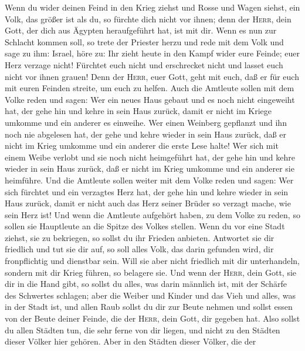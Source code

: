  Wenn du wider deinen Feind in den Krieg ziehst und Rosse
und Wagen siehst, ein Volk, das größer ist als du, so fürchte dich nicht
vor ihnen; denn der \textsc{Herr}, dein Gott, der dich aus Ägypten
heraufgeführt hat, ist mit dir.  Wenn es nun zur Schlacht
kommen soll, so trete der Priester herzu und rede mit dem Volk und sage
zu ihm: Israel, höre zu:  Ihr zieht heute in den Kampf
wider eure Feinde; euer Herz verzage nicht! Fürchtet euch nicht und
erschrecket nicht und lasset euch nicht vor ihnen grauen! 
Denn der \textsc{Herr}, euer Gott, geht mit euch, daß er für euch mit
euren Feinden streite, um euch zu helfen.  Auch die
Amtleute sollen mit dem Volke reden und sagen: Wer ein neues Haus gebaut
und es noch nicht eingeweiht hat, der gehe hin und kehre in sein Haus
zurück, damit er nicht im Kriege umkomme und ein anderer es einweihe.
 Wer einen Weinberg gepflanzt und ihn noch nie abgelesen
hat, der gehe und kehre wieder in sein Haus zurück, daß er nicht im
Krieg umkomme und ein anderer die erste Lese halte!  Wer
sich mit einem Weibe verlobt und sie noch nicht heimgeführt hat, der
gehe hin und kehre wieder in sein Haus zurück, daß er nicht im Krieg
umkomme und ein anderer sie heimführe.  Und die Amtleute
sollen weiter mit dem Volke reden und sagen: Wer sich fürchtet und ein
verzagtes Herz hat, der gehe hin und kehre wieder in sein Haus zurück,
damit er nicht auch das Herz seiner Brüder so verzagt mache, wie sein
Herz ist!  Und wenn die Amtleute aufgehört haben, zu dem
Volke zu reden, so sollen sie Hauptleute an die Spitze des Volkes
stellen.  Wenn du vor eine Stadt ziehst, sie zu
bekriegen, so sollst du ihr Frieden anbieten.  Antwortet
sie dir friedlich und tut sie dir auf, so soll alles Volk, das darin
gefunden wird, dir fronpflichtig und dienstbar sein. 
Will sie aber nicht friedlich mit dir unterhandeln, sondern mit dir
Krieg führen, so belagere sie.  Und wenn der
\textsc{Herr}, dein Gott, sie dir in die Hand gibt, so sollst du alles,
was darin männlich ist, mit der Schärfe des Schwertes schlagen;
 aber die Weiber und Kinder und das Vieh und alles, was
in der Stadt ist, und allen Raub sollst du dir zur Beute nehmen und
sollst essen von der Beute deiner Feinde, die der \textsc{Herr}, dein
Gott, dir gegeben hat.  Also sollst du allen Städten tun,
die sehr ferne von dir liegen, und nicht zu den Städten dieser Völker
hier gehören.  Aber in den Städten dieser Völker, die der
